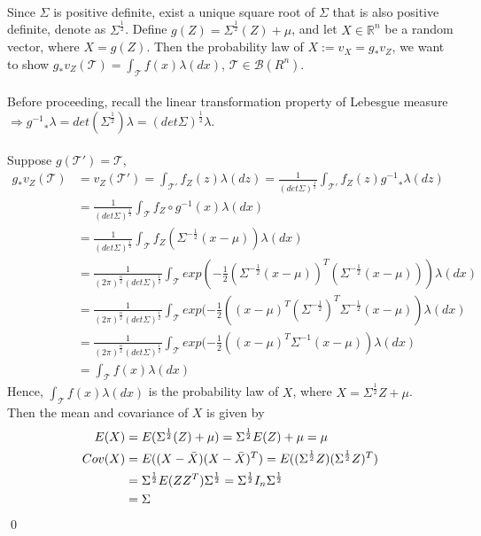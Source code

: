 \begin{answer}
\\Since $\Sigma$ is positive definite, exist a unique square root of $\Sigma$ that is also positive definite, denote as $\Sigma^{\frac{1}{2}}$. Define $g(Z)=\Sigma^{\frac{1}{2}}(Z)+\mu  $, and let $X \in \mathbb{R}^n$ be a random vector, where $X = g(Z)$. Then the probability law of $X := v_X =  g_{\ast}v_Z$, we want to show $g_{\ast}v_Z(\mathcal{T}) = \int_{\mathcal{T}}f(x)\lambda(dx)$, $ \mathcal{T} \in \mathcal{B}(R^n)$.\\
\\Before proceeding, recall the linear transformation property of Lebesgue measure $\Longrightarrow {g^{-1}}_{\ast}\lambda = det(\Sigma^{\frac{1}{2}})\lambda = (det\Sigma)^{\frac{1}{2}}\lambda$.\\
\\
Suppose $g(\mathcal{T}') = \mathcal{T}$, \begin{equation*}
    \begin{aligned}
        g_{\ast}v_{Z}(\mathcal{T}) &= v_{Z}(\mathcal{T}') = \int_{\mathcal{T}'}f_Z(z)\lambda(dz)
        = \frac{1}{(det\Sigma)^{\frac{1}{2}}}\int_{\mathcal{T}'}f_Z(z){g^{-1}}_{\ast}\lambda(dz)
        \\&= \frac{1}{(det\Sigma)^{\frac{1}{2}}}\int_{\mathcal{T}}f_Z\circ g^{-1}(x)\lambda(dx)
        \\&= \frac{1}{(det\Sigma)^{\frac{1}{2}}}\int_{\mathcal{T}}f_Z(\Sigma^{-\frac{1}{2}}(x-\mu))\lambda(dx)
        \\&= \frac{1}{(2 \pi)^{\frac{n}{2}}(det\Sigma)^{\frac{1}{2}}}\int_{\mathcal{T}}exp(-\frac{1}{2}(\Sigma^{-\frac{1}{2}}(x-\mu))^{T}(\Sigma^{-\frac{1}{2}}(x-\mu)))\lambda(dx)
        \\&= \frac{1}{(2 \pi)^{\frac{n}{2}}(det\Sigma)^{\frac{1}{2}}}\int_{\mathcal{T}}exp(-\frac{1}{2}((x-\mu)^{T}(\Sigma^{-\frac{1}{2}})^{T}\Sigma^{-\frac{1}{2}}(x-\mu))\lambda(dx)
         \\&= \frac{1}{(2 \pi)^{\frac{n}{2}}(det\Sigma)^{\frac{1}{2}}}\int_{\mathcal{T}}exp(-\frac{1}{2}((x-\mu)^{T}\Sigma^{-1}(x-\mu))\lambda(dx)
         \\&= \int_{\mathcal{T}}f(x)\lambda(dx)
    \end{aligned}
\end{equation*}
Hence, $\int_{\mathcal{T}}f(x)\lambda(dx)$ is the probability law of $X$, where $X = \Sigma^{\frac{1}{2}}Z+\mu$. 
\\Then the mean and covariance of $X$ is given by
\begin{equation*}
    \begin{aligned}
        E(X) &= E(\Sigma^{\frac{1}{2}}(Z)+\mu)=
        \Sigma^{\frac{1}{2}}E(Z)+\mu = \mu
        \\
        Cov(X) &= E((X-\Bar{X})(X-\Bar{X})^T)=E((\Sigma^{\frac{1}{2}}Z)(\Sigma^{\frac{1}{2}}Z)^T)
        \\&=\Sigma^{\frac{1}{2}}E(ZZ^T)\Sigma^{\frac{1}{2}}
        =\Sigma^{\frac{1}{2}}I_n\Sigma^{\frac{1}{2}}
        \\&=\Sigma
    \end{aligned}
\end{equation*}
\qed \qquad
\end{answer}
